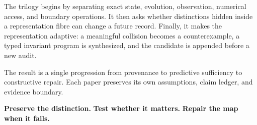 \documentclass[11pt]{article}
\begin{document}
\vspace{0.42in}
The trilogy begins by separating exact state, evolution, observation, numerical access, and boundary operations. It then asks whether distinctions hidden inside a representation fibre can change a future record. Finally, it makes the representation adaptive: a meaningful collision becomes a counterexample, a typed invariant program is synthesized, and the candidate is appended before a new audit.

The result is a single progression from provenance to predictive sufficiency to constructive repair. Each paper preserves its own assumptions, claim ledger, and evidence boundary.

\vfill
\begin{center}
{\small\color{vdgray}
\textbf{Preserve the distinction.}\quad
\textbf{Test whether it matters.}\quad
\textbf{Repair the map when it fails.}}
\end{center}
\vspace{0.28in}
\clearpage
\end{document}
